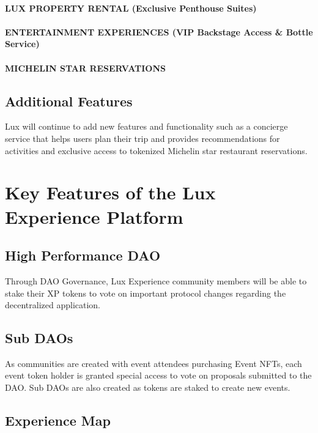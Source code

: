 \documentclass[11pt]{article}
\begin{document}
\paragraph{LUX PROPERTY RENTAL (Exclusive Penthouse Suites)}

\paragraph{ENTERTAINMENT EXPERIENCES (VIP Backstage Access \& Bottle Service)}

\paragraph{MICHELIN STAR RESERVATIONS}

\subsection{Additional Features}

Lux will continue to add new features and functionality such as a concierge service that helps users plan their trip and provides recommendations for activities and exclusive access to tokenized Michelin star restaurant reservations.


\section{Key Features of the Lux Experience Platform}

\subsection{High Performance DAO}

Through DAO Governance, Lux Experience community members will be able to stake their XP tokens to vote on important protocol changes regarding the decentralized application.


\subsection{Sub DAOs}

As communities are created with event attendees purchasing Event NFTs, each event token holder is granted special access to vote on proposals submitted to the DAO. Sub DAOs are also created as tokens are staked to create new events.


\subsection{Experience Map}
\end{document}
